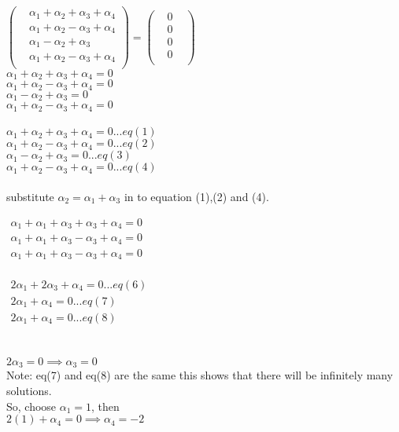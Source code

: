 \documentclass[45pt]{article}
\begin{document}
\begin{enumerate}
\begin{enumerate}
$ \begin{pmatrix}
    &\alpha_1+\alpha_2+\alpha_3 +\alpha_4\\
    &\alpha_1+\alpha_2-\alpha_3 +\alpha_4\\
    &\alpha_1-\alpha_2+\alpha_3\\
    &\alpha_1+\alpha_2-\alpha_3 +\alpha_4\\
  \end{pmatrix} =\begin{pmatrix}
    &0&\\&0&\\ &0&\\&0&\\
  \end{pmatrix}$\\
      $\alpha_1+\alpha_2+\alpha_3 +\alpha_4 =0$\\
      $\alpha_1+\alpha_2-\alpha_3 +\alpha_4=0$\\
      $\alpha_1-\alpha_2+\alpha_3=0$\\
      $\alpha_1+\alpha_2-\alpha_3 +\alpha_4=0$\\
  
 \\
      $\alpha_1+\alpha_2+\alpha_3 +\alpha_4 =0...eq(1)$\\
      $\alpha_1+\alpha_2-\alpha_3 +\alpha_4=0...eq(2)$\\
      $\alpha_1-\alpha_2+\alpha_3=0...eq(3)$\\
      $\alpha_1+\alpha_2-\alpha_3 +\alpha_4=0...eq(4)$\\

\\
 substitute $\alpha_2=\alpha_1+\alpha_3$ in to equation (1),(2) and (4).
    
$ \begin{matrix}
       \alpha_1+\alpha_1+\alpha_3+\alpha_3 +\alpha_4 =0\\
      \alpha_1+\alpha_1+\alpha_3-\alpha_3 +\alpha_4=0\\
      \alpha_1+\alpha_1+\alpha_3-\alpha_3 +\alpha_4=0
\end{matrix} $\\\\

$\begin{matrix}
     2\alpha_1+2\alpha_3 +\alpha_4 =0 ...eq(6)\\
     2\alpha_1+\alpha_4=0...eq(7)\\
     2\alpha_1+\alpha_4=0...eq(8)
\end{matrix}$
  \\\\
\\
$2\alpha_3 = 0 \implies \alpha_3=0$\\
Note: eq(7) and eq(8) are the same this shows that there will be infinitely many solutions.\\ 
So, choose $\alpha_1=1$, then\\
$2(1)+\alpha_4=0 \implies \alpha_4=-2$\\


\end{enumerate}
\end{enumerate}
\end{document}
